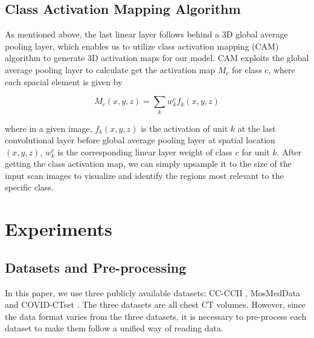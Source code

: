 \documentclass[letterpaper]{article}
\begin{document}
\subsection{Class Activation Mapping Algorithm}


As mentioned above, the last linear layer follows behind a 3D global average pooling layer, which enables us to utilize class activation mapping (CAM) algorithm to generate 3D activation maps for our model. CAM exploits the global average pooling layer to calculate get the activation map $M_c$ for class $c$, where each spacial element is given by

\begin{equation}
M_{c}(x, y, z)=\sum_{k} w_{k}^{c} f_{k}(x, y, z)
\label{eq:activation_map}
\end{equation}


\noindent  where in a given image, $f_{k}(x, y, z)$ is the activation  of unit $k$ at the last convolutional layer before global average pooling layer at spatial location $(x,y,z)$, $w_{k}^{c}$ is the corresponding linear layer weight of class $c$ for unit $k$. After getting the class activation map, we can simply upsample it to the size of the input scan images to visualize and identify the regions most relevant to the specific class.


\section{Experiments}
\label{section:exp}



\subsection{Datasets and Pre-processing}
\label{section:dataset}
In this paper, we use three publicly available datasets: CC-CCII \cite{cell_covid}, MosMedData \cite{mosmeddata} and COVID-CTset \cite{covid-ctset}. The three datasets are all chest CT volumes. However, since the data format varies from the three datasets, it is necessary to pre-process each dataset to make them follow a unified way of reading data.
\end{document}
